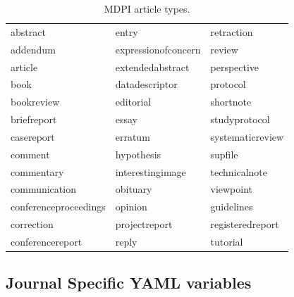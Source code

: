 \documentclass[notspecified,article,submit,moreauthors,pdftex]{Definitions/mdpi}
\begin{document}
\begin{table}

\caption{\label{tab:mdpitype}MDPI article types.}
\centering
\begin{tabular}[t]{lll}
\toprule
abstract & entry & retraction\\
addendum & expressionofconcern & review\\
article & extendedabstract & perspective\\
book & datadescriptor & protocol\\
bookreview & editorial & shortnote\\
\addlinespace
briefreport & essay & studyprotocol\\
casereport & erratum & systematicreview\\
comment & hypothesis & supfile\\
commentary & interestingimage & technicalnote\\
communication & obituary & viewpoint\\
\addlinespace
conferenceproceedings & opinion & guidelines\\
correction & projectreport & registeredreport\\
conferencereport & reply & tutorial\\
\bottomrule
\end{tabular}
\end{table}

\hypertarget{journal-specific-yaml-variables}{%
\subsection{Journal Specific YAML
variables}\label{journal-specific-yaml-variables}}
\end{document}
